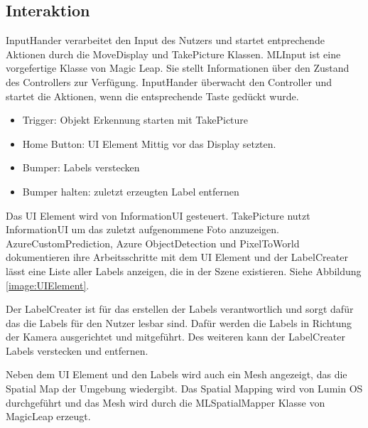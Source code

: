 \subsection{Interaktion}

InputHander verarbeitet den Input des Nutzers und startet entprechende Aktionen durch die MoveDisplay und TakePicture Klassen. 
MLInput ist eine vorgefertige Klasse von Magic Leap. Sie stellt Informationen über den Zustand des Controllers zur Verfügung. InputHander überwacht den Controller und startet die Aktionen, wenn die entsprechende Taste gedückt wurde.

\begin{itemize}
	\item Trigger: Objekt Erkennung starten mit TakePicture
	\item Home Button: UI Element Mittig vor das Display setzten.
	\item Bumper: Labels verstecken
	\item Bumper halten: zuletzt erzeugten Label entfernen 
\end{itemize}

Das UI Element wird von InformationUI gesteuert. TakePicture nutzt InformationUI um das zuletzt aufgenommene Foto anzuzeigen. AzureCustomPrediction, Azure ObjectDetection und PixelToWorld dokumentieren ihre Arbeitsschritte mit dem UI Element und der LabelCreater lässt eine Liste aller Labels anzeigen, die in der Szene existieren. Siehe Abbildung \ref{image:UIElement}.


Der LabelCreater ist für das erstellen der Labels verantwortlich und sorgt dafür das die Labels für den Nutzer lesbar sind.
Dafür werden die Labels in Richtung der Kamera ausgerichtet und mitgeführt.
Des weiteren kann der LabelCreater Labels verstecken und entfernen.

Neben dem UI Element und den Labels wird auch ein Mesh angezeigt, das die Spatial Map der Umgebung wiedergibt. Das Spatial Mapping wird von Lumin OS durchgeführt und das Mesh wird durch die MLSpatialMapper Klasse von MagicLeap erzeugt.

